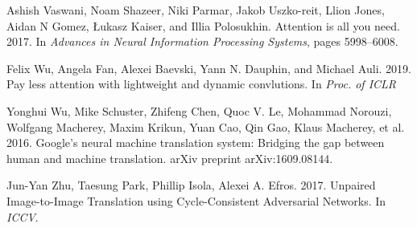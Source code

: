 \documentclass{article}
\begin{document}
\begin{enumerate}[label={[\arabic*]}, leftmargin=0.55cm]
  \item Ashish Vaswani, Noam Shazeer, Niki Parmar, Jakob Uszko-reit, Llion Jones, Aidan N Gomez, Łukasz Kaiser, and Illia Polosukhin. Attention is all you need. 2017. In \textit{Advances in Neural Information Processing Systems}, pages 5998–6008.
  \label{itm:transformer}

  \item Felix Wu, Angela Fan, Alexei Baevski, Yann N. Dauphin, and Michael Auli. 2019. Pay less attention with lightweight and dynamic convlutions. In \textit{Proc. of ICLR}
  \label{itm:pay_less_attention}

  \item Yonghui Wu, Mike Schuster, Zhifeng Chen, Quoc V. Le, Mohammad Norouzi, Wolfgang Macherey, Maxim Krikun, Yuan Cao, Qin Gao, Klaus Macherey, et al. 2016. Google’s neural machine translation system: Bridging the gap between human and machine translation. arXiv preprint arXiv:1609.08144.
  \label{itm:gnmt}

  \item Jun-Yan Zhu, Taesung Park, Phillip Isola, Alexei A. Efros. 2017. Unpaired Image-to-Image Translation using Cycle-Consistent Adversarial Networks. In \textit{ICCV}.
  \label{itm:cycle_gan}

\end{enumerate}
\end{document}
